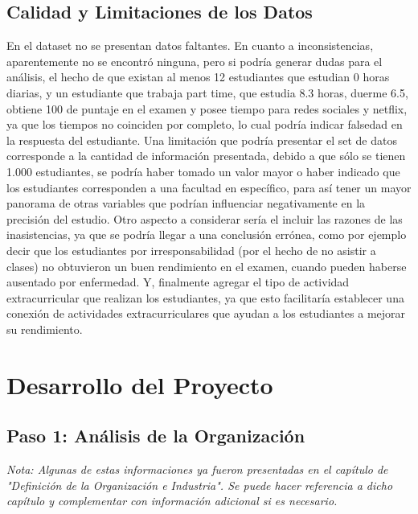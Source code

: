 \documentclass[12pt,letterpaper]{report}
\begin{document}
\section{Calidad y Limitaciones de los Datos}
En el dataset no se presentan datos faltantes. En cuanto a inconsistencias, aparentemente no se encontró ninguna, pero si podría generar dudas para el análisis, el hecho de que existan al menos 12 estudiantes que estudian 0 horas diarias, y un estudiante que trabaja part time, que estudia 8.3 horas, duerme 6.5, obtiene 100 de puntaje en el examen y posee tiempo para redes sociales y netflix, ya que los tiempos no coinciden por completo, lo cual podría indicar falsedad en la respuesta del estudiante.
Una limitación que podría presentar el set de datos corresponde a la cantidad de información presentada, debido a que sólo se tienen 1.000 estudiantes, se podría haber tomado un valor mayor o haber indicado que los estudiantes corresponden a una facultad en específico, para así tener un mayor panorama de otras variables que podrían influenciar negativamente en la precisión del estudio. Otro aspecto a considerar sería el incluir las razones de las inasistencias, ya que se podría llegar a una conclusión errónea, como por ejemplo decir que los estudiantes por irresponsabilidad (por el hecho de no asistir a clases) no obtuvieron un buen rendimiento en el examen, cuando pueden haberse ausentado por enfermedad. Y,
finalmente agregar el tipo de actividad extracurricular que realizan los estudiantes, ya que esto facilitaría establecer una conexión de actividades extracurriculares que ayudan a los estudiantes a mejorar su rendimiento.
\newpage

\chapter{Desarrollo del Proyecto}

\section{Paso 1: Análisis de la Organización}
\textit{Nota: Algunas de estas informaciones ya fueron presentadas en el capítulo de "Definición de la Organización e Industria". Se puede hacer referencia a dicho capítulo y complementar con información adicional si es necesario.}
\end{document}
